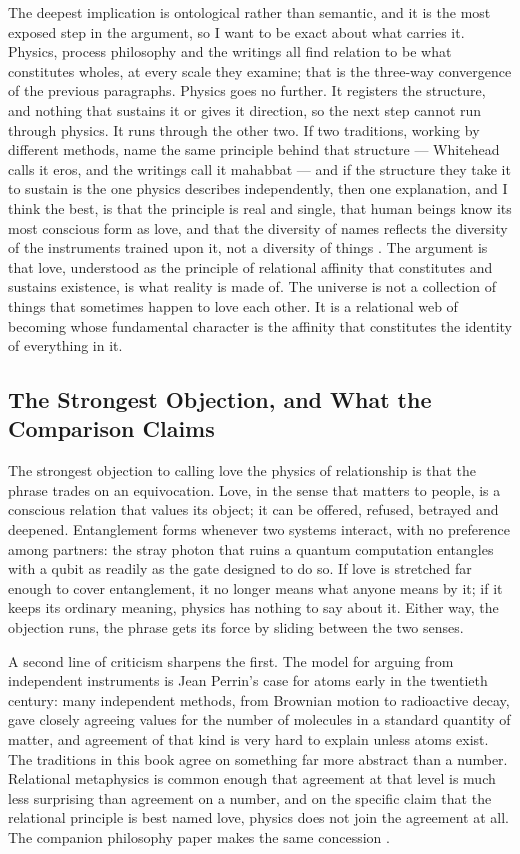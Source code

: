 The deepest implication is ontological rather than semantic, and it is the most exposed step in the argument, so I want to be exact about what carries it. Physics, process philosophy and the \bahai writings all find relation to be what constitutes wholes, at every scale they examine; that is the three-way convergence of the previous paragraphs. Physics goes no further. It registers the structure, and nothing that sustains it or gives it direction, so the next step cannot run through physics. It runs through the other two. If two traditions, working by different methods, name the same principle behind that structure — Whitehead calls it eros, and the \bahai writings call it mahabbat — and if the structure they take it to sustain is the one physics describes independently, then one explanation, and I think the best, is that the principle is real and single, that human beings know its most conscious form as love, and that the diversity of names reflects the diversity of the instruments trained upon it, not a diversity of things \citep{AdamsThreePaths}. The argument is that love, understood as the principle of relational affinity that constitutes and sustains existence, is what reality is made of. The universe is not a collection of things that sometimes happen to love each other. It is a relational web of becoming whose fundamental character is the affinity that constitutes the identity of everything in it.

\subsection*{The Strongest Objection, and What the Comparison Claims}

The strongest objection to calling love the physics of relationship is that the phrase trades on an equivocation. Love, in the sense that matters to people, is a conscious relation that values its object; it can be offered, refused, betrayed and deepened. Entanglement forms whenever two systems interact, with no preference among partners: the stray photon that ruins a quantum computation entangles with a qubit as readily as the gate designed to do so. If love is stretched far enough to cover entanglement, it no longer means what anyone means by it; if it keeps its ordinary meaning, physics has nothing to say about it. Either way, the objection runs, the phrase gets its force by sliding between the two senses.

A second line of criticism sharpens the first. The model for arguing from independent instruments is Jean Perrin's case for atoms early in the twentieth century: many independent methods, from Brownian motion to radioactive decay, gave closely agreeing values for the number of molecules in a standard quantity of matter, and agreement of that kind is very hard to explain unless atoms exist. The traditions in this book agree on something far more abstract than a number. Relational metaphysics is common enough that agreement at that level is much less surprising than agreement on a number, and on the specific claim that the relational principle is best named love, physics does not join the agreement at all. The companion philosophy paper makes the same concession \citep{AdamsThreePaths}.

